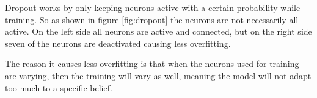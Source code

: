 Dropout works by only keeping neurons active with a certain probability while training. So as shown in figure \ref{fig:dropout} the neurons are not necessarily all active. On the left side all neurons are active and connected, but on the right side seven of the neurons are deactivated causing less overfitting.  


The reason it causes less overfitting is that when the neurons used for training are varying, then the training will vary as well, meaning the model will not adapt too much to a specific belief. 



